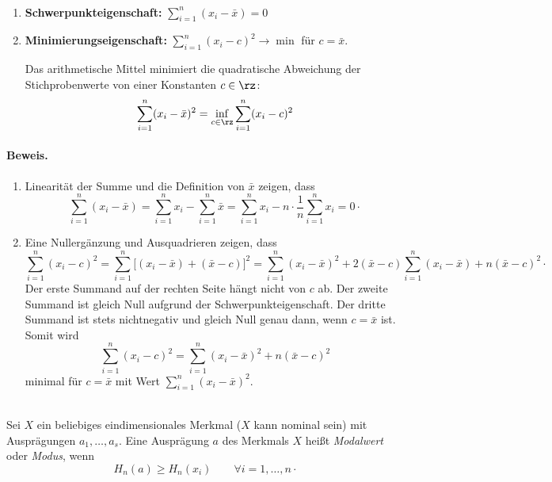 \begin{satz}   \\
\begin{enumerate}[label=(\alph*)]
    \item \textbf{Schwerpunkteigenschaft:} $\displaystyle\sum_{i=1}^n (x_i-\bar x) = 0$
    \item \textbf{Minimierungseigenschaft:} $\displaystyle\sum_{i=1}^n (x_i-c)^2 \to \min$ für $c=\bar x$.

    Das arithmetische Mittel minimiert die quadratische Abweichung der Stichprobenwerte von einer Konstanten $c\in\rz$:
    \[
        \sum_{i=1}^n (x_i-\bar x)^2 = \inf_{c\in\rz} \sum_{i=1}^n (x_i-c)^2
    \]
\end{enumerate}
\paragraph{Beweis.}
\begin{enumerate}[label=(\alph*)]
    \item Linearität der Summe und die Definition von $\bar x$ zeigen, dass
    \[
        \sum_{i=1}^n (x_i-\bar x) = \sum_{i=1}^n x_i - \sum_{i=1}^n \bar x = \sum_{i=1}^n x_i - n\cdot\frac1n\sum_{i=1}^n x_i = 0 \cdot
    \]
    \item Eine Nullergänzung und Ausquadrieren zeigen, dass
    \[
        \sum_{i=1}^n (x_i-c)^2 = \sum_{i=1}^n \big[(x_i-\bar x)+(\bar x-c)\big]^2 = \sum_{i=1}^n (x_i-\bar x)^2 + 2(\bar x-c)\sum_{i=1}^n (x_i-\bar x) + n(\bar x-c)^2 \cdot
    \]
    Der erste Summand auf der rechten Seite hängt nicht von $c$ ab.
    Der zweite Summand ist gleich Null aufgrund der Schwerpunkteigenschaft.
    Der dritte Summand ist stets nichtnegativ und gleich Null genau dann, wenn $c=\bar x$ ist.
    Somit wird
    \[
        \sum_{i=1}^n (x_i-c)^2 = \sum_{i=1}^n (x_i-\bar x)^2 + n(\bar x-c)^2
    \]
    minimal für $c=\bar x$ mit Wert $\sum_{i=1}^n (x_i-\bar x)^2$. \qedhere
\end{enumerate}
\end{satz}




\begin{defi}  \\
    Sei $X$ ein beliebiges eindimensionales \gls{Merkmal} ($X$ kann nominal sein) mit Ausprägungen $a_1,\dots,a_s$.
    Eine Ausprägung $a$ des \gls{Merkmal}s $X$ heißt \emph{Modalwert} oder \emph{Modus}, wenn
    \[
        H_n(a) \geq H_n(x_i) \qquad \forall i=1,\dots,n \cdot
    \]
\end{defi}

